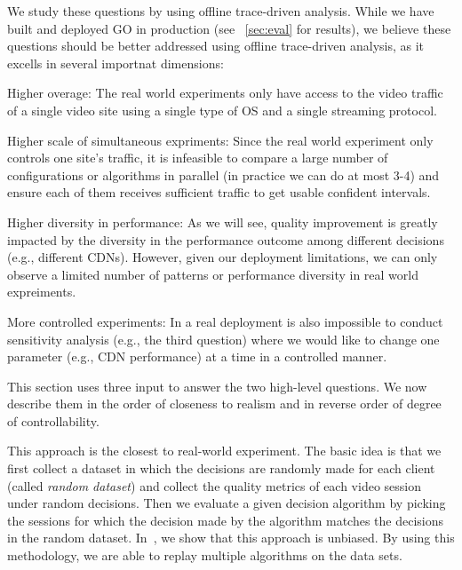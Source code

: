 We study these questions by using offline trace-driven analysis. While we have built and deployed GO in production (see \Section~\ref{sec:eval} for results), we believe these questions should be better addressed using offline trace-driven analysis, as it excells in several importnat dimensions:
\begin{packedenumerate}
	\item Higher overage: The real world experiments only have access to the video traffic of a single video site using a single type of OS and a single streaming protocol. %
	\item Higher scale of simultaneous expriments: Since the real world experiment only controls one site's traffic, it is infeasible to compare a large number of configurations or algorithms in parallel (in practice we can do at most 3-4) and ensure each of them receives sufficient traffic to get usable confident intervals.
	\item Higher diversity in performance: As we will see, quality improvement is greatly impacted by the diversity in the performance outcome among different decisions (e.g., different CDNs). However, given our deployment limitations, we can only observe a limited number of patterns or performance diversity in real world expreiments.
	\item More controlled experiments: In a real deployment is also impossible to conduct sensitivity analysis (e.g., the third question) where we would like to change one parameter (e.g., CDN performance) at a time in a controlled manner.
\end{packedenumerate}


This section uses three input to answer the two high-level questions. We now describe them in the order of closeness to realism and in reverse order of degree of controllability.

 This approach is the closest to real-world experiment. The basic idea is that we first collect a dataset in which the decisions are randomly made for each client (called {\it random dataset}) and collect the quality metrics of each video session under random decisions. Then we evaluate a given decision algorithm by picking the sessions for which the decision made by the algorithm matches the decisions in the random dataset. In~\cite{technicalreport}, we show that this approach is unbiased. 
By using this methodology, we are able to replay multiple algorithms on the data sets.

